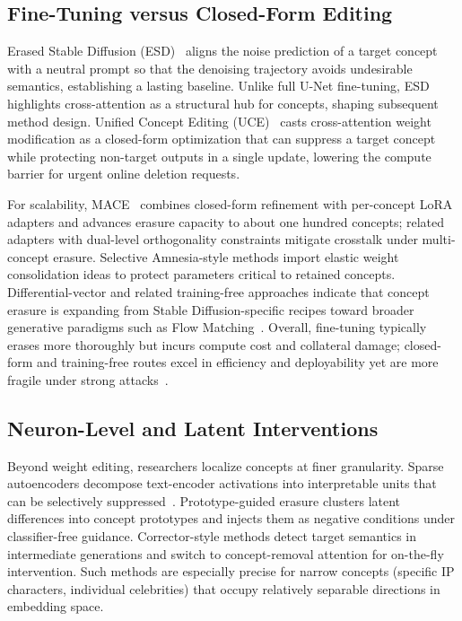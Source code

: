 \documentclass[10pt,twocolumn,letterpaper]{article}
\begin{document}
\subsection{Fine-Tuning versus Closed-Form Editing}

Erased Stable Diffusion (ESD)~\cite{gandikota2023esd} aligns the noise prediction of a target concept with a neutral prompt so that the denoising trajectory avoids undesirable semantics, establishing a lasting baseline. Unlike full U-Net fine-tuning, ESD highlights cross-attention as a structural hub for concepts, shaping subsequent method design. Unified Concept Editing (UCE)~\cite{gandikota2024uce} casts cross-attention weight modification as a closed-form optimization that can suppress a target concept while protecting non-target outputs in a single update, lowering the compute barrier for urgent online deletion requests.

For scalability, MACE~\cite{lu2024mace} combines closed-form refinement with per-concept LoRA adapters and advances erasure capacity to about one hundred concepts; related adapters with dual-level orthogonality constraints mitigate crosstalk under multi-concept erasure. Selective Amnesia-style methods import elastic weight consolidation ideas to protect parameters critical to retained concepts. Differential-vector and related training-free approaches indicate that concept erasure is expanding from Stable Diffusion-specific recipes toward broader generative paradigms such as Flow Matching~\cite{safavigerdini2026}. Overall, fine-tuning typically erases more thoroughly but incurs compute cost and collateral damage; closed-form and training-free routes excel in efficiency and deployability yet are more fragile under strong attacks~\cite{moon2025hub}.

\subsection{Neuron-Level and Latent Interventions}

Beyond weight editing, researchers localize concepts at finer granularity. Sparse autoencoders decompose text-encoder activations into interpretable units that can be selectively suppressed~\cite{safavigerdini2026}. Prototype-guided erasure clusters latent differences into concept prototypes and injects them as negative conditions under classifier-free guidance. Corrector-style methods detect target semantics in intermediate generations and switch to concept-removal attention for on-the-fly intervention. Such methods are especially precise for narrow concepts (specific IP characters, individual celebrities) that occupy relatively separable directions in embedding space.
\end{document}
